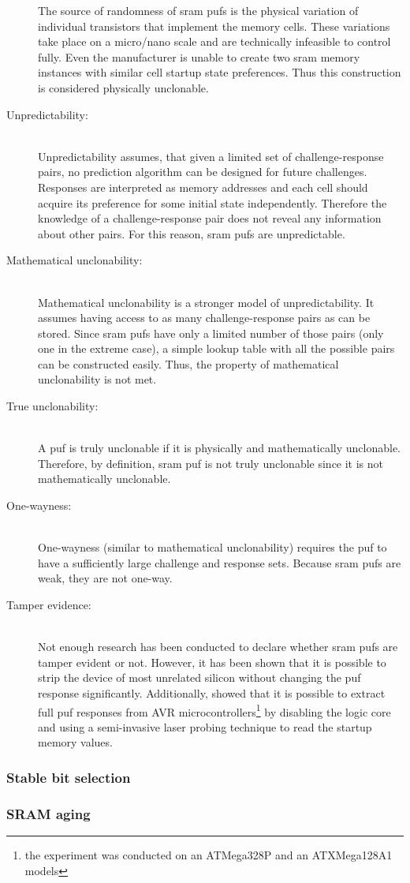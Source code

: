 \begin{description}
        The source of randomness of \gls{sram} \glspl{puf} is the physical variation of individual transistors that implement the memory cells. These variations take place on a micro/nano scale and are technically infeasible to control fully. Even the manufacturer is unable to create two \gls{sram} memory instances with similar cell startup state preferences. Thus this construction is considered physically unclonable.
    \item[Unpredictability:] \hfill \\
        Unpredictability assumes, that given a limited set of challenge-response pairs, no prediction algorithm can be designed for future challenges. Responses are interpreted as memory addresses and each cell should acquire its preference for some initial state independently. Therefore the knowledge of a challenge-response pair does not reveal any information about other pairs. For this reason, \gls{sram} \glspl{puf} are unpredictable. %
    \item[Mathematical unclonability:] \hfill \\
        Mathematical unclonability is a stronger model of unpredictability. It assumes having access to as many challenge-response pairs as can be stored. Since \gls{sram} \glspl{puf} have only a limited number of those pairs (only one in the extreme case), a simple lookup table with all the possible pairs can be constructed easily. Thus, the property of mathematical unclonability is not met.
    \item[True unclonability:] \hfill \\
        A \gls{puf} is truly unclonable if it is physically and mathematically unclonable. Therefore, by definition, \gls{sram} \gls{puf} is not truly unclonable since it is not mathematically unclonable.
    \item[One-wayness:] \hfill \\
        One-wayness (similar to mathematical unclonability) requires the \gls{puf} to have a sufficiently large challenge and response sets. Because \gls{sram} \glspl{puf} are weak, they are not one-way.
    \item[Tamper evidence:] \hfill \\
        Not enough research has been conducted to declare whether \gls{sram} \glspl{puf} are tamper evident or not\cite{Maes2012}. However, it has been shown that it is possible to strip the device of most unrelated silicon without changing the \gls{puf} response significantly\cite{Helfmaier2013}. Additionally, \cite{Nedospasov2013} showed that it is possible to extract full \gls{puf} responses from AVR microcontrollers\footnote{the experiment was conducted on an ATMega328P and an ATXMega128A1 models} by disabling the logic core and using a semi-invasive laser probing technique to read the startup memory values.
\end{description}


\subsubsection*{Stable bit selection}

\subsubsection*{SRAM aging}


